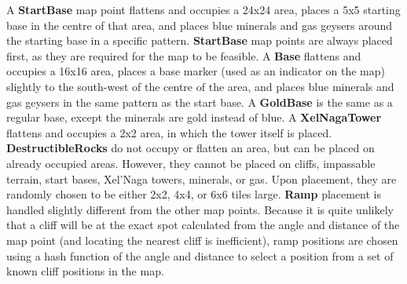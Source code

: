 A \textbf{StartBase} map point flattens and occupies a 24x24 area, places a 5x5 starting base in the centre of that area, and places blue minerals and gas geysers around the starting base in a specific pattern. \textbf{StartBase} map points are always placed first, as they are required for the map to be feasible. A \textbf{Base} flattens and occupies a 16x16 area, places a base marker (used as an indicator on the map) slightly to the south-west of the centre of the area, and places blue minerals and gas geysers in the same pattern as the start base. A \textbf{GoldBase} is the same as a regular base, except the minerals are gold instead of blue. A \textbf{XelNagaTower} flattens and occupies a 2x2 area, in which the tower itself is placed. \textbf{DestructibleRocks} do not occupy or flatten an area, but can be placed on already occupied areas. However, they cannot be placed on cliffs, impassable terrain, start bases, Xel'Naga towers, minerals, or gas. Upon placement, they are randomly chosen to be either 2x2, 4x4, or 6x6 tiles large. \textbf{Ramp} placement is handled slightly different from the other map points. Because it is quite unlikely that a cliff will be at the exact spot calculated from the angle and distance of the map point (and locating the nearest cliff is inefficient), ramp positions are chosen using a hash function of the angle and distance to select a position from a set of known cliff positions in the map.